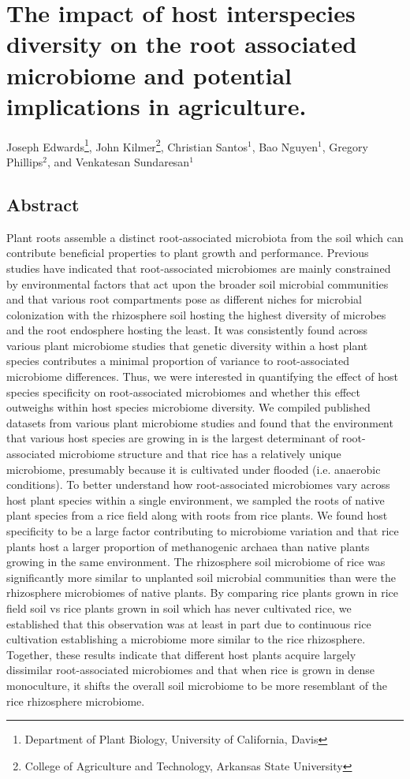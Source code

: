 \chapter{The impact of host interspecies diversity on the root associated microbiome and potential implications in agriculture.}

Joseph Edwards\footnote[1]{Department of Plant Biology, University of California, Davis}, John Kilmer\footnote[2]{College of Agriculture and Technology, Arkansas State University}, Christian Santos$^1$, Bao Nguyen$^1$, Gregory Phillips$^2$, and Venkatesan Sundaresan$^1$

\section{Abstract}

Plant roots assemble a distinct root-associated microbiota from the soil which can contribute beneficial properties to plant growth and performance. Previous studies have indicated that root-associated microbiomes are mainly constrained by environmental factors that act upon the broader soil microbial communities and that various root compartments pose as different niches for microbial colonization with the rhizosphere soil hosting the highest diversity of microbes and the root endosphere hosting the least. It was consistently found across various plant microbiome studies that genetic diversity within a host plant species contributes a minimal proportion of variance to root-associated microbiome differences. Thus, we were interested in quantifying the effect of host species specificity on root-associated microbiomes and whether this effect outweighs within host species microbiome diversity. We compiled published datasets from various plant microbiome studies and found that the environment that various host species are growing in is the largest determinant of root-associated microbiome structure and that rice has a relatively unique microbiome, presumably because it is cultivated under flooded (i.e. anaerobic conditions). To better understand how root-associated microbiomes vary across host plant species within a single environment, we sampled the roots of native plant species from a rice field along with roots from rice plants. We found host specificity to be a large factor contributing to microbiome variation and that rice plants host a larger proportion of methanogenic archaea than native plants growing in the same environment. The rhizosphere soil microbiome of rice was significantly more similar to unplanted soil microbial communities than were the rhizosphere microbiomes of native plants. By comparing rice plants grown in rice field soil vs rice plants grown in soil which has never cultivated rice, we established that this observation was at least in part due to continuous rice cultivation establishing a microbiome more similar to the rice rhizosphere. Together, these results indicate that different host plants acquire largely dissimilar root-associated microbiomes and that when rice is grown in dense monoculture, it shifts the overall soil microbiome to be more resemblant of the rice rhizosphere microbiome.

